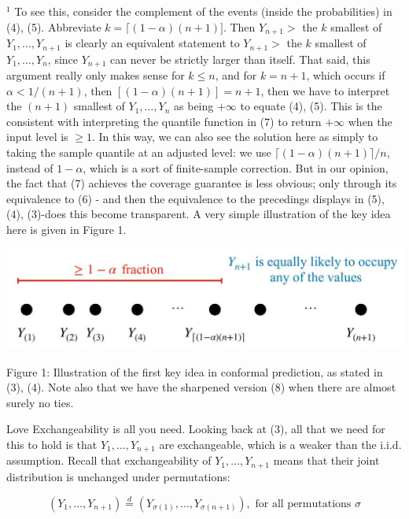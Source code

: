 \documentclass[10pt]{article}
\begin{document}
${ }^{1}$ To see this, consider the complement of the events (inside the probabilities) in (4), (5). Abbreviate $k=\lceil(1-\alpha)(n+1)]$. Then $Y_{n+1}>$ the $k$ smallest of $Y_{1}, \ldots, Y_{n+1}$ is clearly an equivalent statement to $Y_{n+1}>$ the $k$ smallest of $Y_{1}, \ldots, Y_{n}$, since $Y_{n+1}$ can never be strictly larger than itself. That said, this argument really only makes sense for $k \leq n$, and for $k=n+1$, which occurs if $\alpha<1 /(n+1)$, then $[(1-\alpha)(n+1)]=n+1$, then we have to interpret the $(n+1)$ smallest of $Y_{1}, \ldots, Y_{n}$ as being $+\infty$ to equate (4), (5). This is the consistent with interpreting the quantile function in (7) to return $+\infty$ when the input level is $\geq 1$. In this way, we can also see the solution here as simply to taking the sample quantile at an adjusted level: we use $\lceil(1-\alpha)(n+1)\rceil / n$, instead of $1-\alpha$, which is a sort of finite-sample correction. But in our opinion, the fact that (7) achieves the coverage guarantee is less obvious; only through its equivalence to (6) - and then the equivalence to the precedings displays in (5), (4), (3)-does this become transparent. A very simple illustration of the key idea here is given in Figure 1.

\begin{center}
\includegraphics[max width=\textwidth]{2023_10_05_3f4b7f0ae8e12ec8ac84g-03}
\end{center}

Figure 1: Illustration of the first key idea in conformal prediction, as stated in (3), (4). Note also that we have the sharpened version (8) when there are almost surely no ties.

Love Exchangeability is all you need. Looking back at (3), all that we need for this to hold is that $Y_{1}, \ldots, Y_{n+1}$ are exchangeable, which is a weaker than the i.i.d. assumption. Recall that exchangeability of $Y_{1}, \ldots, Y_{n+1}$ means that their joint distribution is unchanged under permutations:

$$
\left(Y_{1}, \ldots, Y_{n+1}\right) \stackrel{d}{=}\left(Y_{\sigma(1)}, \ldots, Y_{\sigma(n+1)}\right), \text { for all permutations } \sigma
$$
\end{document}

